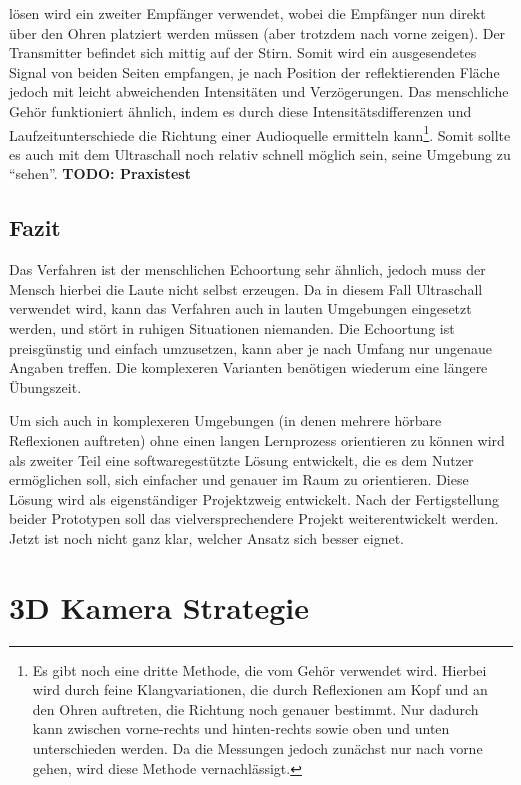 \documentclass[a4paper,12pt,ngerman]{scrartcl}
\begin{document}
lösen wird ein zweiter Empfänger verwendet, wobei die Empfänger nun direkt über den Ohren 
platziert werden müssen (aber trotzdem nach vorne zeigen). Der Transmitter befindet sich 
mittig auf der Stirn. Somit wird ein ausgesendetes Signal von beiden Seiten empfangen, je 
nach Position der reflektierenden Fläche jedoch mit leicht abweichenden Intensitäten und 
Verzögerungen. Das menschliche Gehör funktioniert ähnlich, indem es durch diese 
Intensitätsdifferenzen und Laufzeitunterschiede die Richtung einer Audioquelle ermitteln 
kann\footnote{Es gibt noch eine dritte Methode, die vom Gehör verwendet wird. Hierbei wird 
durch feine Klangvariationen, die durch Reflexionen am Kopf und an den Ohren auftreten, die 
Richtung noch genauer bestimmt. Nur dadurch kann zwischen vorne-rechts und hinten-rechts 
sowie oben und unten unterschieden werden. Da die Messungen jedoch zunächst nur nach vorne 
gehen, wird diese Methode vernachlässigt.}. Somit sollte es auch mit dem Ultraschall noch 
relativ schnell möglich sein, seine Umgebung zu \enquote{sehen}. \textbf{TODO: Praxistest}

\subsection{Fazit}

Das Verfahren ist der menschlichen Echoortung sehr ähnlich, jedoch muss der Mensch hierbei 
die Laute nicht selbst erzeugen. Da in diesem Fall Ultraschall verwendet wird, kann das 
Verfahren auch in lauten Umgebungen eingesetzt werden, und stört in ruhigen Situationen 
niemanden. Die Echoortung ist preisgünstig und einfach umzusetzen, kann aber je nach 
Umfang nur ungenaue Angaben treffen. Die komplexeren Varianten benötigen wiederum eine 
längere Übungszeit. \par
Um sich auch in komplexeren Umgebungen (in denen mehrere hörbare Reflexionen auftreten)
ohne einen langen Lernprozess orientieren zu können wird als zweiter Teil eine
softwaregestützte Lösung entwickelt, die es dem Nutzer ermöglichen soll, sich einfacher
und genauer im Raum zu orientieren. Diese Lösung wird als eigenständiger Projektzweig 
entwickelt. Nach der Fertigstellung beider Prototypen soll das vielversprechendere Projekt 
weiterentwickelt werden. Jetzt ist noch nicht ganz klar, welcher Ansatz sich besser eignet.

\newpage

\section{3D Kamera Strategie}
\end{document}
